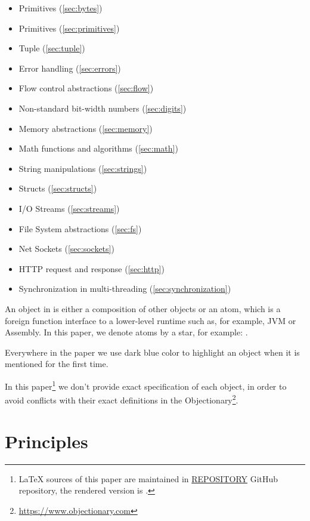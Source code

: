 \documentclass[sigplan,11pt,nonacm]{acmart}
\newcommand\aff[1]{\ff{\textcolor{gray}{$\star$}#1}}
\begin{document}
\begin{itemize}
    \item Primitives (\cref{sec:bytes})
    \item Primitives (\cref{sec:primitives})
    \item Tuple (\cref{sec:tuple})
    \item Error handling (\cref{sec:errors})
    \item Flow control abstractions (\cref{sec:flow})
    \item Non-standard bit-width numbers (\cref{sec:digits})
    \item Memory abstractions (\cref{sec:memory})
    \item Math functions and algorithms (\cref{sec:math})
    \item String manipulations (\cref{sec:strings})
    \item Structs (\cref{sec:structs})
    \item I/O Streams (\cref{sec:streams})
    \item File System abstractions (\cref{sec:fs})
    \item Net Sockets (\cref{sec:sockets})
    \item HTTP request and response (\cref{sec:http})
    \item Synchronization in multi-threading (\cref{sec:synchronization})
\end{itemize}

An object in \eolang{} is either a composition of other objects or an atom, which is a
foreign function interface to a lower-level runtime such as, for example, JVM
or Assembly. In this paper, we denote atoms by a star, for example:
\aff{times}.

Everywhere in the paper we use dark blue color to highlight an object when it is
mentioned for the first time.

In this paper\footnote{%
\LaTeX{} sources of this paper are maintained in
\href{https://github.com/REPOSITORY}{REPOSITORY} GitHub repository,
the rendered version is \href{https://github.com/REPOSITORY/releases/tag/0.0.0}{}.}
we don't provide exact specification of each object, in order to avoid
conflicts with their exact definitions in the
Objectionary\footnote{\url{https://www.objectionary.com}}.

\section{Principles}
\end{document}
